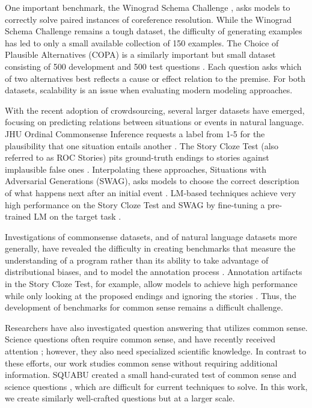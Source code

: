 One important benchmark, the Winograd Schema Challenge \cite{Levesque2011TheWS}, asks models to correctly solve paired instances of coreference resolution. While the Winograd Schema Challenge remains a tough dataset, the difficulty of generating examples has led to only a small available collection of 150 examples. The Choice of Plausible Alternatives (COPA) is a similarly important but small dataset consisting of 500 development and 500 test questions \cite{roemmele2011choice}. Each question asks which of two alternatives best reflects a cause or effect relation to the premise. For both datasets, scalability is an issue when evaluating modern modeling approaches.

With the recent adoption of crowdsourcing, several larger datasets have emerged, focusing on predicting relations between situations or events in natural language. JHU Ordinal Commonsense Inference requests a label from 1-5 for the plausibility that one situation entails another \cite{Zhang2017OrdinalCI}. The Story Cloze Test (also referred to as ROC Stories) pits ground-truth endings to stories against implausible false ones \cite{mostafazadeh2016corpus}. Interpolating these approaches, Situations with Adversarial Generations (SWAG), asks models to choose the correct description of what happens next after an initial event \cite{zellers2018swag}. LM-based techniques achieve very high performance on the Story Cloze Test and \textsc{SWAG} by fine-tuning a pre-trained LM on the target task \cite{radford2018improving,devlin2018BERT}. 

Investigations of commonsense datasets, and of natural language datasets more generally, have revealed the difficulty in creating benchmarks that measure the understanding of a program rather than its ability to take advantage of distributional biases, and to model the annotation process \cite{gururangan2018annotation,poliak2018hypothesis}. Annotation artifacts in the Story Cloze Test, for example, allow models to achieve high performance while only looking at the proposed endings and ignoring the stories \cite{Schwartz2017TheEO,Cai2017PayAT}. Thus, the development of benchmarks for common sense remains a difficult challenge.

Researchers have also investigated question answering that utilizes common sense. Science questions often require common sense, and have recently received attention \cite{clark2018think,mihaylov2018can, Ostermann2018MCScriptAN}; however, they also need specialized scientific knowledge. In contrast to these efforts, our work studies common sense without requiring additional information. SQUABU created a small hand-curated test of common sense and science questions \cite{davis2016write}, which are difficult for current techniques to solve. In this work, we create similarly well-crafted questions but at a larger scale.

